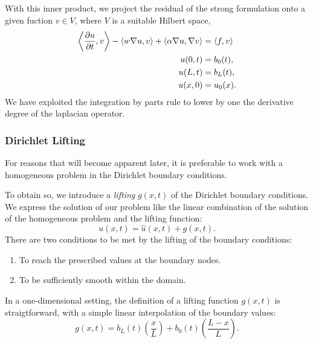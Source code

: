 \documentclass[../main.tex]{subfiles}
\newcommand{\inner}[2]{\left<#1, #2\right>}
\begin{document}
With this inner product, we project the residual of the strong formulation onto a given fuction $v \in V$,
where $V$ is a suitable Hilbert space,
\begin{subequations}
    \begin{align}
        \label{eq:1d_fom_weak_formulation}
        \inner{\frac{\partial u}{\partial t}}{v} - \inner{w \grad u}{v} + \inner{\alpha \grad u}{\grad v} &= \inner{f}{v} \\
        u(0, t) &= b_0(t), \\
        u(L, t) &= b_L(t), \\
        u(x, 0) &= u_0(x).
    \end{align}
\end{subequations}
We have exploited the integration by parts rule to lower by one the derivative degree of the laplacian operator.

\subsubsection{Dirichlet Lifting}
\label{sec:1d_fom_heat_equation_dirichlet_lifting}
For reasons that will become apparent later, it is preferable to work with a homogeneous problem in the Dirichlet boundary conditions.

To obtain so, we introduce a \emph{lifting} $g(x,t)$ of the Dirichlet boundary conditions.
We express the solution of our problem like the linear combination of the solution of the homogeneous problem and the lifting function:
\begin{equation}
    \label{eq:1d_fom_homogeneous_plus_lifting}
    u(x,t) = \hat{u}(x,t) + g(x,t).
\end{equation}
There are two conditions to be met by the lifting of the boundary conditions:
\begin{enumerate}
    \item To reach the prescribed values at the boundary nodes.
    \item To be sufficiently smooth within the domain.
\end{enumerate}
In a one-dimensional setting, the definition of a lifting function $g(x,t)$ is straigtforward, with a simple linear interpolation of the boundary values:
\begin{equation}
    \label{eq:1d_fom_dirichlet_lifting}
    g(x,t) = b_L(t) \left(\frac{x}{L}\right) + b_0(t) \left(\frac{L - x}{L}\right).
\end{equation}
\end{document}
